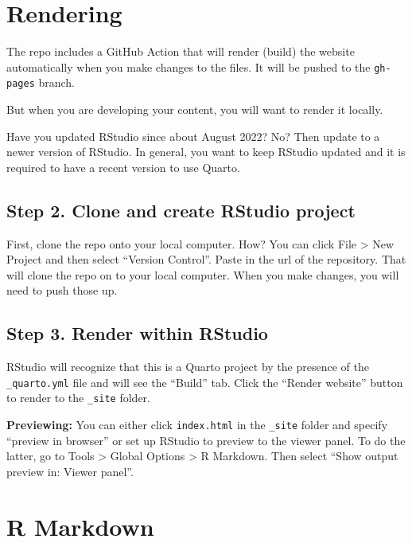\documentclass[
  letterpaper,
  oneside,
  open=any]{scrbook}
\begin{document}

\hypertarget{rendering}{%
\chapter{Rendering}\label{rendering}}

The repo includes a GitHub Action that will render (build) the website
automatically when you make changes to the files. It will be pushed to
the \texttt{gh-pages} branch.

But when you are developing your content, you will want to render it
locally.

Have you updated RStudio since about August 2022? No? Then update to a
newer version of RStudio. In general, you want to keep RStudio updated
and it is required to have a recent version to use Quarto.

\hypertarget{step-2.-clone-and-create-rstudio-project}{%
\section{Step 2. Clone and create RStudio
project}\label{step-2.-clone-and-create-rstudio-project}}

First, clone the repo onto your local computer. How? You can click File
\textgreater{} New Project and then select ``Version Control''. Paste in
the url of the repository. That will clone the repo on to your local
computer. When you make changes, you will need to push those up.

\hypertarget{step-3.-render-within-rstudio}{%
\section{Step 3. Render within
RStudio}\label{step-3.-render-within-rstudio}}

RStudio will recognize that this is a Quarto project by the presence of
the \texttt{\_quarto.yml} file and will see the ``Build'' tab. Click the
``Render website'' button to render to the \texttt{\_site} folder.

\textbf{Previewing:} You can either click \texttt{index.html} in the
\texttt{\_site} folder and specify ``preview in browser'' or set up
RStudio to preview to the viewer panel. To do the latter, go to Tools
\textgreater{} Global Options \textgreater{} R Markdown. Then select
``Show output preview in: Viewer panel''.


\hypertarget{r-markdown}{%
\chapter{R Markdown}\label{r-markdown}}
\end{document}
